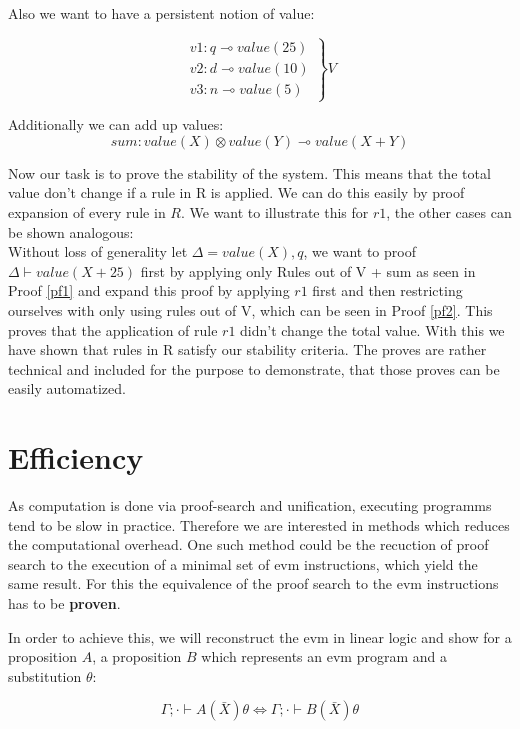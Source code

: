 \documentclass[sigconf]{acmart}
\begin{document}
Also we want to have a persistent notion of value:

\[ \left.
\begin{array}{l}
  v1: q\multimap value(25) \\
  v2: d\multimap value(10) \\
  v3: n\multimap value(5)
\end{array}
\right\} V \]

Additionally we can add up values:
\[ sum: value(X)\otimes value(Y)\multimap value(X + Y) \]

Now our task is to prove the stability of the system. This means that the total value don't change if a rule in R is applied. We can do this easily by proof expansion of every rule in $R$.
We want to illustrate this for $r1$, the other cases can be shown analogous:
\\
Without loss of generality let $\Delta = value(X), q$, we want to proof $\Delta \vdash value(X + 25)$ first by applying only Rules out of V + sum as seen in Proof \ref{pf1} and expand this proof by applying $r1$ first and then restricting ourselves with only using rules out of V, which can be seen in Proof \ref{pf2}. This proves that the application of rule $r1$ didn't change the total value.
With this we have shown that rules in R satisfy our stability criteria.
The proves are rather technical and included for the purpose to demonstrate, that those proves can be easily automatized.

\section{Efficiency}
As computation is done via proof-search and unification, executing programms tend to be slow in practice. Therefore we are interested in methods which reduces the computational overhead. One such method could be the recuction of proof search to the execution of a minimal set of evm instructions, which yield the same result. For this the equivalence of the proof search to the evm instructions has to be \textbf{proven}.

In order to achieve this, we will reconstruct the evm in linear logic and show for a proposition $A$, a proposition $B$ which represents an evm program and a substitution $\theta$:

\[ \Gamma; \cdot \vdash A(\bar X)\theta \Leftrightarrow \Gamma; \cdot \vdash B(\bar X)\theta \]
\end{document}

